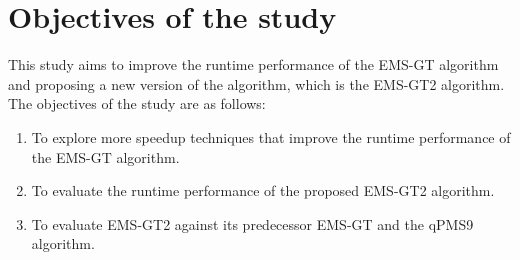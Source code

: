 \section{Objectives of the study}

This study aims to improve the runtime performance of the EMS-GT algorithm and proposing a new version of the algorithm, which is the EMS-GT2 algorithm. The objectives of the study are as follows:

\begin{enumerate}
	\item To explore more speedup techniques that improve the runtime performance of the EMS-GT algorithm.

	\item To evaluate the runtime performance of the proposed EMS-GT2 algorithm.

	\item To evaluate EMS-GT2 against its predecessor EMS-GT and the qPMS9 algorithm.
\end{enumerate}